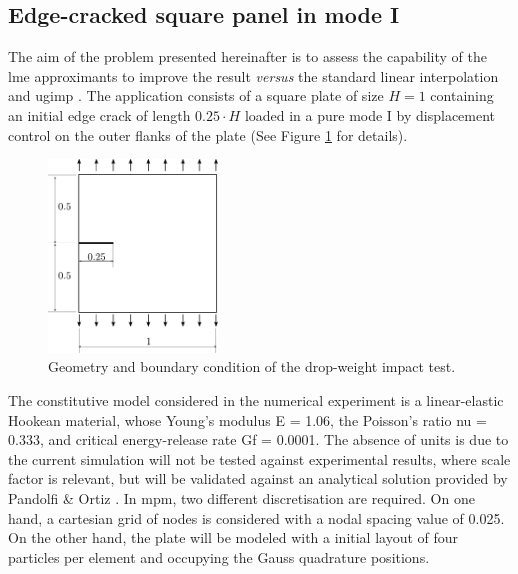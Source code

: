 \documentclass[preprint,12pt,a4paper]{elsarticle}
\begin{document}
\subsection{Edge-cracked square panel in mode I}
\label{sec:3.1}
The aim of the problem presented hereinafter is to assess the
capability of the \acrshort{lme} approximants to improve the result
\textit{versus} the standard linear interpolation and \acrshort{ugimp}
\cite{Bardenhagen2004}. The application
consists of a square plate of size $H = 1$ containing an initial edge
crack of length $0.25 \cdot H$ loaded in a pure mode I by displacement
control on the outer flanks of the plate (See Figure
\ref{fig:geometry-cracked-panel-mode-I} for details). 
\begin{figure}
  \centering
  \includegraphics[width=0.4\textwidth]{Figure-Mode_I}
  \caption{Geometry and boundary condition of the drop-weight impact test.}
  \label{fig:geometry-cracked-panel-mode-I}
\end{figure}
The constitutive model considered in the numerical experiment is a
linear-elastic Hookean material, whose Young's modulus \gls{E} = 1.06, the Poisson's ratio \gls{nu} = 0.333, and
critical energy-release rate \gls{Gf} = 0.0001. The absence of units is due to the current
simulation will not be tested against experimental results, where
scale factor is relevant, but will be validated against an analytical
solution provided by Pandolfi \& Ortiz \cite{Pandolfi_2012}. In
\acrshort{mpm}, two different discretisation are required. On one
hand, a cartesian grid of nodes is considered with a nodal spacing
value of 0.025. On the other hand, the plate will be modeled with a
initial layout of four particles per element and occupying the Gauss
quadrature positions.\\
\end{document}
